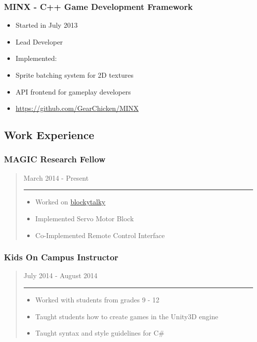 \documentclass[a4paper,12pt]{article}
\begin{document}
\subsubsection{MINX - C++ Game Development
Framework}\label{minx---c-game-development-framework}

\begin{itemize}
\itemsep1pt\parskip0pt
\item
  Started in July 2013
\item
  Lead Developer
\item
  Implemented:
\item
  Sprite batching system for 2D textures
\item
  API frontend for gameplay developers
\item
  \url{https://github.com/GearChicken/MINX}
\end{itemize}

\subsection{Work Experience}\label{work-experience}

\subsubsection{MAGIC Research Fellow}\label{magic-research-fellow}

\begin{quote}
March 2014 - Present

\begin{center}\rule{3in}{0.4pt}\end{center}

\begin{itemize}
\itemsep1pt\parskip0pt
\item
  Worked on
  \href{https://github.com/liam-middlebrook/blockytalky.git}{blockytalky}
\item
  Implemented Servo Motor Block
\item
  Co-Implemented Remote Control Interface
\end{itemize}
\end{quote}

\subsubsection{Kids On Campus
Instructor}\label{kids-on-campus-instructor}

\begin{quote}
July 2014 - August 2014

\begin{center}\rule{3in}{0.4pt}\end{center}

\begin{itemize}
\itemsep1pt\parskip0pt
\item
  Worked with students from grades 9 - 12
\item
  Taught students how to create games in the Unity3D engine
\item
  Taught syntax and style guidelines for C\#
\end{itemize}
\end{quote}
\end{document}
